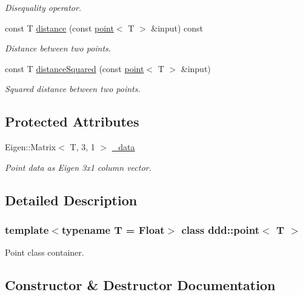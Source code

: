 \begin{DoxyCompactItemize}
\begin{DoxyCompactList}\small\item\em Disequality operator. \end{DoxyCompactList}\item 
const T \hyperlink{classddd_1_1point_a59d8714cc178090ddf75b0c9dbd832c9}{distance} (const \hyperlink{classddd_1_1point}{point}$<$ T $>$ \&input) const
\begin{DoxyCompactList}\small\item\em Distance between two points. \end{DoxyCompactList}\item 
const T \hyperlink{classddd_1_1point_a4b6793fd154fc9ad4dd93a4927d4ee13}{distance\+Squared} (const \hyperlink{classddd_1_1point}{point}$<$ T $>$ \&input)
\begin{DoxyCompactList}\small\item\em Squared distance between two points. \end{DoxyCompactList}\end{DoxyCompactItemize}
\subsection*{Protected Attributes}
\begin{DoxyCompactItemize}
\item 
\mbox{\label{classddd_1_1point_af4781a60e5c93aeaaab5c66add25b991}} 
Eigen\+::\+Matrix$<$ T, 3, 1 $>$ \hyperlink{classddd_1_1point_af4781a60e5c93aeaaab5c66add25b991}{\+\_\+data}
\begin{DoxyCompactList}\small\item\em Point data as Eigen 3x1 column vector. \end{DoxyCompactList}\end{DoxyCompactItemize}


\subsection{Detailed Description}
\subsubsection*{template$<$typename T = Float$>$\newline
class ddd\+::point$<$ T $>$}

Point class container. 

\subsection{Constructor \& Destructor Documentation}
\mbox{\label{classddd_1_1point_a0146118d518509e9e7cdf4fb6733eb48}} 
